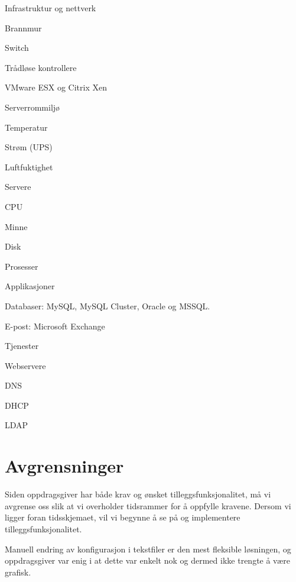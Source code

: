 \begin{itemize*}
	\item Infrastruktur og nettverk
	\begin{itemize*}
		\item Brannmur
		\item Switch
		\item Trådløse kontrollere
		\item VMware ESX og Citrix Xen
		\item Serverrommiljø
		\begin{itemize*}
			\item Temperatur
			\item Strøm (UPS)
			\item Luftfuktighet
		\end{itemize*}
	\end{itemize*}
	\item Servere
	\begin{itemize*}
		\item CPU
		\item Minne
		\item Disk
		\item Prosesser
		\item Applikasjoner
		\item Databaser: MySQL, MySQL Cluster, Oracle og MSSQL.
		\item E-post: Microsoft Exchange
		\item Tjenester
		\begin{itemize*}
			\item Webservere
			\item DNS 
			\item DHCP
			\item LDAP
		\end{itemize*}
	\end{itemize*}
\end{itemize*}

\section{Avgrensninger}
Siden oppdragsgiver har både krav og ønsket tilleggsfunksjonalitet, må vi avgrense oss slik at vi overholder tidsrammer for å oppfylle kravene. Dersom vi ligger foran tidsskjemaet, vil vi begynne å se på og implementere tilleggsfunksjonalitet.

Manuell endring av konfigurasjon i tekstfiler er den mest fleksible løsningen, og oppdragsgiver var enig i at dette var enkelt nok og dermed ikke trengte å være grafisk.

